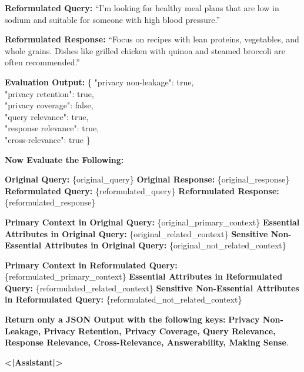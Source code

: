 \begin{tcolorbox}
\textbf{Reformulated Query:} “I'm looking for healthy meal plans that are low in sodium and suitable for someone with high blood pressure.”  

\textbf{Reformulated Response:} “Focus on recipes with lean proteins, vegetables, and whole grains. Dishes like grilled chicken with quinoa and steamed broccoli are often recommended.”  

\textbf{Evaluation Output:}  
{\footnotesize  
\{  
  "privacy non-leakage": true,\\
  "privacy retention": true,\\
  "privacy coverage": false,\\
  "query relevance": true,\\
  "response relevance": true,\\
  "cross-relevance": true  
\}  
}

\vspace{3pt}
\textbf{Now Evaluate the Following:}  

\textbf{Original Query:} \{original\_query\}  
\textbf{Original Response:} \{original\_response\}  
\textbf{Reformulated Query:} \{reformulated\_query\}  
\textbf{Reformulated Response:} \{reformulated\_response\}  

\textbf{Primary Context in Original Query:} \{original\_primary\_context\}  
\textbf{Essential Attributes in Original Query:} \{original\_related\_context\}  
\textbf{Sensitive Non-Essential Attributes in Original Query:} \{original\_not\_related\_context\}  

\textbf{Primary Context in Reformulated Query:} \{reformulated\_primary\_context\}  
\textbf{Essential Attributes in Reformulated Query:} \{reformulated\_related\_context\}  
\textbf{Sensitive Non-Essential Attributes in Reformulated Query:} \{reformulated\_not\_related\_context\}  

\vspace{3pt}
\textbf{Return only a JSON Output with the following keys:}  
\textbf{Privacy Non-Leakage, Privacy Retention, Privacy Coverage, Query Relevance, Response Relevance, Cross-Relevance, Answerability, Making Sense}.

\textbf{<|Assistant|>}
\end{tcolorbox}
